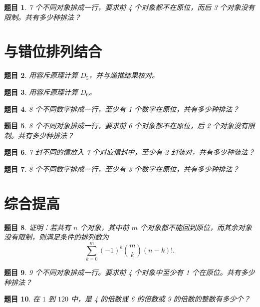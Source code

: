 \documentclass[11pt,a4paper,fontset=fandol]{ctexart}
\theoremstyle{formalexample}
\newtheorem{exercise}{题目}[section]
\begin{document}
\begin{exercise}
7 个不同对象排成一行，要求前 4 个对象都不在原位，而后 3 个对象没有限制。共有多少种排法？
\end{exercise}

\section{与错位排列结合}

\begin{exercise}
用容斥原理计算 $D_5$，并与递推结果核对。
\end{exercise}

\begin{exercise}
用容斥原理计算 $D_6$。
\end{exercise}

\begin{exercise}
8 个不同数字排成一行，至少有 1 个数字在原位，共有多少种排法？
\end{exercise}

\begin{exercise}
8 个不同对象排成一行，要求前 6 个对象都不在原位，后 2 个对象没有限制。共有多少种排法？
\end{exercise}

\begin{exercise}
7 封不同的信放入 7 个对应信封中，至少有 2 封装对，共有多少种装法？
\end{exercise}

\begin{exercise}
8 个不同数字排成一行，至少有 3 个数字在原位，共有多少种排法？
\end{exercise}

\section{综合提高}

\begin{exercise}
证明：若共有 $n$ 个对象，其中前 $m$ 个对象都不能回到原位，而其余对象没有限制，则满足条件的排列数为
\[
\sum_{k=0}^{m}(-1)^k\binom{m}{k}(n-k)!.
\]
\end{exercise}

\begin{exercise}
9 个不同对象排成一行。要求前 4 个对象中至少有 1 个在原位。共有多少种排法？
\end{exercise}

\begin{exercise}
在 $1$ 到 $120$ 中，是 4 的倍数或 6 的倍数或 9 的倍数的整数有多少个？
\end{exercise}
\end{document}
